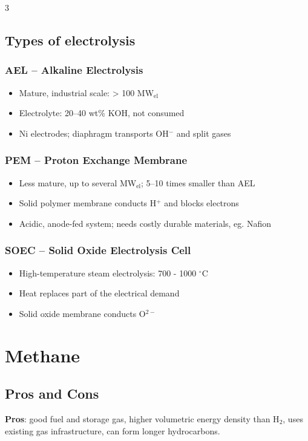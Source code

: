 \documentclass[9pt, landscape, a4paper]{article}
\newcommand{\cel}{\ensuremath{^\circ}C}
\begin{document}
\begin{multicols*}{3}
\subsection{Types of electrolysis}
\subsubsection{AEL -- Alkaline Electrolysis}
\begin{itemize}
  \item Mature, industrial scale: > 100 MW$_\text{el}$
  \item Electrolyte: 20--40 wt\% KOH, not consumed
  \item Ni electrodes; diaphragm transports OH$^-$ and split gases
\end{itemize}

\subsubsection{PEM -- Proton Exchange Membrane}
\begin{itemize}
  \item Less mature, up to several MW$_\text{el}$; 5--10 times smaller than AEL
  \item Solid polymer membrane conducts H$^+$ and blocks electrons
  \item Acidic, anode-fed system; needs costly durable materials, eg. Nafion
\end{itemize}

\subsubsection{SOEC -- Solid Oxide Electrolysis Cell}
\begin{itemize}
  \item High-temperature steam electrolysis: 700 - 1000 \cel
  \item Heat replaces part of the electrical demand
  \item Solid oxide membrane conducts O$^{2-}$
\end{itemize}

\section{Methane}
\subsection{Pros and Cons}
\textbf{Pros}: good fuel and storage gas, higher volumetric energy density than H$_2$,
uses existing gas infrastructure, can form longer hydrocarbons.


\end{multicols*}
\end{document}
